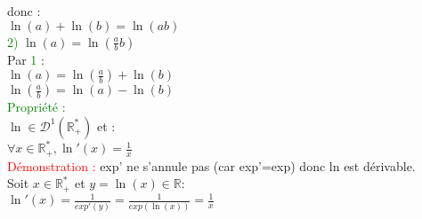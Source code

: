 \documentclass{article}
\begin{document}
 donc : \\
 $\ln (a) + \ln(b) = \ln(ab) $ \\
 \textcolor{green}{2)} $\ln(a)=\ln(\frac{a}{b}b)$ \\
 Par \textcolor{green}{1} : \\
 $\ln(a) = \ln(\frac{a}{b})+\ln(b)$ \\
 $\ln(\frac{a}{b})= \ln(a)-\ln(b)$ \\
 \textcolor{green}{Propriété :} \\
 $\ln \in \mathcal{D}^1(\mathbb{R}^*_+)$ et : \\
 \indent $\forall x \in \mathbb{R}^*_+,\ln'(x)=\frac{1}{x}$ \\
 \textcolor{red}{Démonstration :} exp' ne s'annule pas (car exp'=exp) donc ln est dérivable. \\
 \indent Soit $x \in \mathbb{R}^*_+$ et $y=\ln(x) \in \mathbb{R}$: \\
 $\ln'(x)=\frac{1}{exp'(y)}=\frac{1}{exp(\ln(x))}=\frac{1}{x}$
\end{document}
